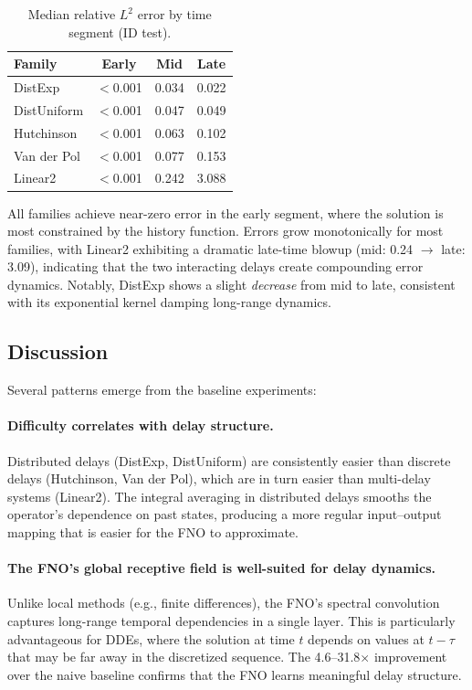 \begin{table}[h]
\centering
\caption{Median relative $L^2$ error by time segment (ID test).}
\label{tab:time-segments}
\begin{tabular}{lccc}
\toprule
Family & Early & Mid & Late \\
\midrule
DistExp     & $<$0.001 & 0.034 & 0.022 \\
DistUniform & $<$0.001 & 0.047 & 0.049 \\
Hutchinson  & $<$0.001 & 0.063 & 0.102 \\
Van der Pol & $<$0.001 & 0.077 & 0.153 \\
Linear2     & $<$0.001 & 0.242 & 3.088 \\
\bottomrule
\end{tabular}
\end{table}

All families achieve near-zero error in the early segment, where the solution
is most constrained by the history function.  Errors grow monotonically for most
families, with Linear2 exhibiting a dramatic late-time blowup (mid: 0.24 $\to$
late: 3.09), indicating that the two interacting delays create compounding error
dynamics.  Notably, DistExp shows a slight \emph{decrease} from mid to late,
consistent with its exponential kernel damping long-range dynamics.

\subsection{Discussion}

Several patterns emerge from the baseline experiments:

\paragraph{Difficulty correlates with delay structure.}
Distributed delays (DistExp, DistUniform) are consistently easier than discrete
delays (Hutchinson, Van der Pol), which are in turn easier than multi-delay
systems (Linear2).  The integral averaging in distributed delays smooths the
operator's dependence on past states, producing a more regular input--output
mapping that is easier for the FNO to approximate.

\paragraph{The FNO's global receptive field is well-suited for delay dynamics.}
Unlike local methods (e.g., finite differences), the FNO's spectral convolution
captures long-range temporal dependencies in a single layer.  This is particularly
advantageous for DDEs, where the solution at time $t$ depends on values at $t - \tau$
that may be far away in the discretized sequence.  The 4.6--31.8$\times$ improvement
over the naive baseline confirms that the FNO learns meaningful delay structure.

